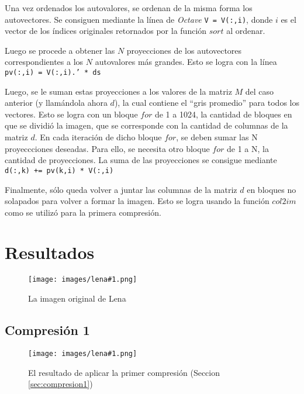 \documentclass[twocolumn,a4paper,10pt]{article}
\begin{document}
Una vez ordenados los autovalores, se ordenan de la misma forma los autovectores. Se consiguen mediante la línea de \textit{Octave} \texttt{V = V(:,i)}, donde $i$ es el vector de los índices originales retornados por la función $sort$ al ordenar.

Luego se procede a obtener las $N$ proyecciones de los autovectores correspondientes a los $N$ autovalores más grandes. Esto se logra con la línea \texttt{pv(:,i) = V(:,i).' * ds}

Luego, se le suman estas proyecciones a los valores de la matriz $M$ del caso anterior (y llam\'andola ahora $d$), la cual contiene el ``gris promedio'' para todos los vectores. Esto se logra con un bloque $for$ de 1 a 1024, la cantidad de bloques en que se dividió la imagen, que se corresponde con la cantidad de columnas de la matriz $d$. En cada iteración de dicho bloque $for$, se deben sumar las N proyeccciones deseadas. Para ello, se necesita otro bloque $for$ de 1 a N, la cantidad de proyecciones. La suma de las proyecciones se consigue mediante \texttt{d(:,k)\: += pv(k,i) * V(:,i)}

Finalmente, s\'olo queda volver a juntar las columnas de la matriz $d$ en bloques no solapados para volver a formar la imagen. Esto se logra usando la funci\'on 
$col2im$ como se utilizó para la primera compresi\'on.

\section{Resultados}
\label{sec:resultados}

\newcommand{\lena}[2]{
    \begin{figure}[H]
        \texttt{[image: images/lena\#1.png]}
        \caption{#2}
        \label{fig:lena#1}
    \end{figure}
}

\newcommand{\autoimage}[2]{
    \begin{figure}[H]
        \texttt{[image: images/autoimage\#1.png]}
        \caption{#2}
        \label{fig:lena#1}
    \end{figure}
}


\lena{512}{La imagen original de Lena}

\subsection{Compresi\'on 1}

\lena{-bruta}{El resultado de aplicar la primer compresi\'on (Seccion \ref{sec:compresion1})}
\end{document}
